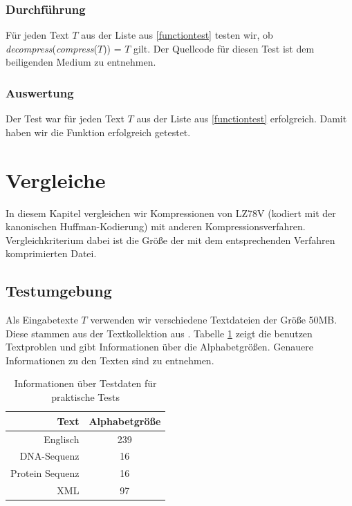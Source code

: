 \documentclass[a4paper,11pt]{scrartcl}%
\theoremstyle{change}
\theoremstyle{nonumberplain}
\theoremstyle{change}
\theoremstyle{nonumberplain}
\theoremstyle{change}
\theoremstyle{nonumberplain}
\begin{document}
\subsubsection{Durchführung}

Für jeden Text $T$ aus der Liste aus \autoref{functiontest} testen wir, ob \newline \textit{decompress}(\textit{compress}($T$)) = $T$ gilt.
Der Quellcode für diesen Test ist dem beiligenden Medium zu entnehmen.

\subsubsection{Auswertung}

Der Test war für jeden Text $T$ aus der Liste aus \autoref{functiontest} erfolgreich. Damit haben wir die Funktion erfolgreich getestet.


	
		
		
				 
	 	
 		
	




\section{Vergleiche}

In diesem Kapitel vergleichen wir Kompressionen von LZ78V (kodiert mit der kanonischen Huffman-Kodierung) mit anderen Kompressionsverfahren.
Vergleichkriterium dabei ist die Größe der mit dem entsprechenden Verfahren komprimierten Datei.

\subsection{Testumgebung}

Als Eingabetexte $T$ verwenden wir verschiedene Textdateien der Größe 50MB. Diese stammen aus der Textkollektion aus \cite{pizza}. Tabelle \ref{tbl:test_texts} zeigt die benutzen Textproblen und gibt Informationen über die Alphabetgrößen. Genauere Informationen zu den Texten sind \cite{pizza} zu entnehmen.

\begin{table}[h] 
	\begin{center}
		\begin{tabular}{|r|c|}\hline
			Text & Alphabetgröße  \\ \hline \hline
			Englisch & 239 \\ \hline
			DNA-Sequenz & 16 \\ \hline
			Protein Sequenz & 16 \\ \hline
			XML & 97 \\ \hline
		\end{tabular}
		\caption{Informationen über Testdaten für praktische Tests}
		\label{tbl:test_texts}
	\end{center}
\end{table}
\end{document}
